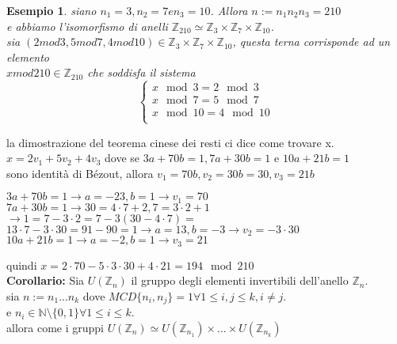 \documentclass[a4paper,12pt]{article}
\theoremstyle{def}
\theoremstyle{prop}
\theoremstyle{esempio}
\newtheorem*{example}{Esempio}
\theoremstyle{dimostrazione}
\theoremstyle{teo}
\theoremstyle{osservazione}
\begin{document}
\begin{example}
    siano \(n_1 = 3, n_2 = 7 e n_3 = 10\). Allora \(n := n_1 n_2 n_3 = 210\)\\
    e abbiamo l'isomorfismo di anelli \(\mathbb{Z}_{210} \simeq \mathbb{Z}_3 \times \mathbb{Z}_7 \times \mathbb{Z}_{10}\).\\
    sia \((2 mod 3, 5 mod 7, 4 mod 10) \in \mathbb{Z}_3 \times \mathbb{Z}_7 \times \mathbb{Z}_{10}\), questa terna corrisponde ad un elemento\\
    \(x mod 210 \in \mathbb{Z}_{210}\) che soddisfa il sistema
    \[
        \begin{cases}
            x\mod 3 = 2\mod 3 \\
            x\mod 7 = 5\mod 7 \\
            x\mod 10 = 4\mod 10\\
        \end{cases}
        \]
\end{example}

la dimostrazione del teorema cinese dei resti ci dice come trovare x.\\
\(x = 2 v_1 + 5 v_2 + 4 v_3\) dove se \(3 a + 70 b = 1, 7 a + 30 b = 1\) e \(10 a + 21 b = 1\)\\
sono identità di Bézout, allora \(v_1 = 70 b, v_2 = 30 b  = 30, v_3 = 21 b\)\\
\begin{center}
    \(3 a + 70 b = 1 \rightarrow a = -23, b = 1 \rightarrow v_1 = 70\)\\
    \(7 a + 30 b = 1 \rightarrow 30 = 4 \cdot 7 + 2 , 7 = 3 \cdot 2 + 1\)\\
    \(\rightarrow 1 = 7 - 3 \cdot 2 = 7 - 3(30 - 4 \cdot 7) = \)\\
    \(13 \cdot 7 - 3 \cdot 30 = 91 - 90 = 1 \rightarrow a = 13, b = -3 \rightarrow v_2 = -3 \cdot 30\)\\
    \(10 a + 21 b = 1 \rightarrow a = -2, b = 1 \rightarrow v_3 = 21\)\\
\end{center}

quindi \(x = 2 \cdot 70 - 5 \cdot 3 \cdot 30 + 4 \cdot 21 = 194\mod 210\)\\

\textbf{Corollario:} Sia \(U(\mathbb{Z}_n)\) il gruppo degli elementi invertibili dell'anello \(\mathbb{Z}_n\).\\
sia \(n := n_1 ... n_k\) dove \(MCD\{n_i, n_j\} = 1 \forall 1 \leq i,j \leq k, i \neq j\).\\
e \(n_i \in \mathbb{N} \setminus \{0,1\} \forall 1 \leq i \leq k\).\\
allora come i gruppi \(U(\mathbb{Z}_n) \simeq U(\mathbb{Z}_{n_1}) \times ... \times U(\mathbb{Z}_{n_k})\)
\end{document}
